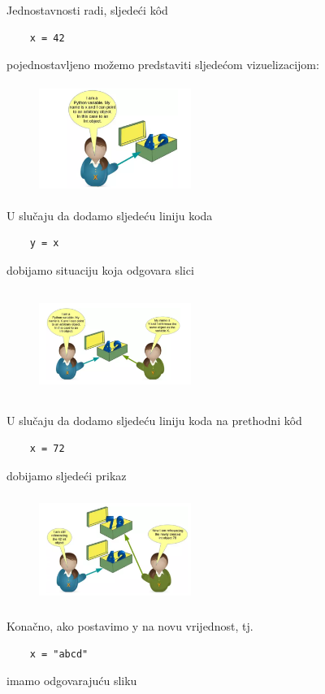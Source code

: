 Jednostavnosti radi, sljedeći k\^od
\begin{verbatim}
    x = 42
\end{verbatim}
 pojednostavljeno možemo predstaviti sljedećom vizuelizacijom:
\begin{figure}[H]
	\centering
   \includegraphics[width=140pt,height=100pt]{slike/variable_object.png}
\end{figure}
U slučaju da dodamo sljedeću liniju   koda 
\begin{verbatim}
	y = x
\end{verbatim}
dobijamo situaciju    koja odgovara slici

\begin{figure}[H]
	\centering
	\includegraphics[width=140pt,height=100pt]{slike/point_two_vars.png}
\end{figure}
U slučaju da dodamo sljedeću liniju koda na prethodni k\^od
\begin{verbatim}
	x = 72
\end{verbatim}
dobijamo sljedeći prikaz
\begin{figure}[H]
	\centering
	\includegraphics[width=140pt,height=100pt]{slike/vars_different_assigned.png}
\end{figure}
Konačno, ako postavimo y na novu vrijednost, tj.
\begin{verbatim}
	x = "abcd" 
\end{verbatim}
imamo odgovarajuću sliku 

